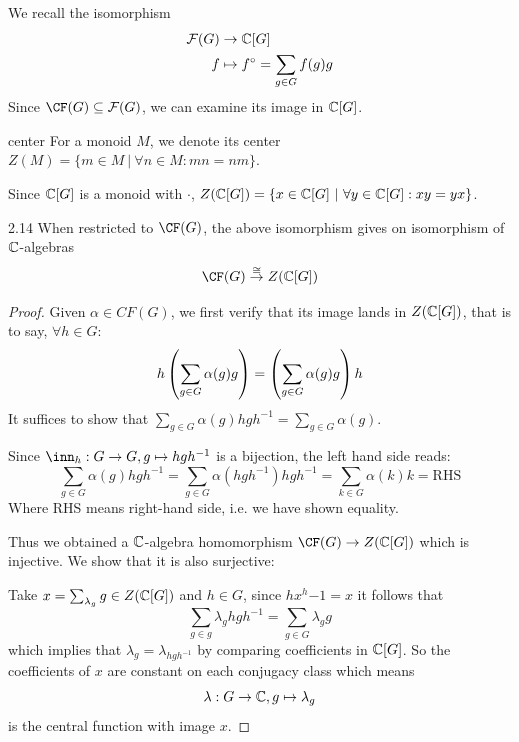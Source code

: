 \documentclass[twoside = false,	%
		headsepline,		%
		parskip = true,
		]{scrbook}						%
\begin{document}
    We recall the isomorphism
    \begin{equation*}
    \begin{split}
        \mathcal F(G) &\to \mathbb C[G] \\
            f &\mapsto f^\circ = \sum_{g \in G}f(g)g
    \end{split}
    \end{equation*}
    Since $\CF(G) \subseteq \cF(G)$, we can examine its image in $\mathbb C[G]$.
    \begin{definition*}{center}
        For a monoid $M$, we denote its center $Z(M) = \{m \in M \ | \ \forall n \in M: mn = nm\}$.
    \end{definition*}
    Since $\mathbb C[G]$ is a monoid with $\cdot$, $Z(\mathbb C[G]) = \{x \in \mathbb C[G] \ | \ \forall y \in \mathbb C[G]: xy = yx \}$.

    \begin{corollary}{}{2.14}
        When restricted to $\CF(G)$, the above isomorphism gives on isomorphism of $\mathbb C$-algebras
        \begin{equation*}
            \CF(G) \overset{\cong}{\to} Z(\C[G])
        \end{equation*}
    \end{corollary}
    \begin{proof}
        Given $\alpha \in CF(G)$, we first verify that its image lands in $Z(\mathbb C[G])$, that is to say, $\forall h \in G$:
        \begin{equation*}
            h \left( \sum_{g \in G} \alpha(g) g\right) = \left( \sum_{g \in G} \alpha(g)g\right)h
        \end{equation*}
        It suffices to show that $\sum_{g \in G} \alpha(g) h g h^{-1} = \sum_{g \in G} \alpha(g)$.
        
        Since $\inn_h: G \to G, g \mapsto hgh^{-1}$ is a bijection, the left hand side reads:
        \begin{equation*}
            \sum_{g \in G} \alpha(g) h g h^{-1} = \sum_{g \in G} \alpha(hgh^{-1}) h g h^{-1} = \sum_{k \in G} \alpha(k) k = \text{RHS}
        \end{equation*}
        Where RHS means right-hand side, i.e. we have shown equality.

        Thus we obtained a $\mathbb C$-algebra homomorphism $\CF(G) \to Z(\C[G])$ which is injective. We show that it is also surjective:

        Take $x = \sum_{\lambda_g} g \in Z(\mathbb C[G])$ and $h \in G$, since $hx^h{-1} = x$ it follows that
        \begin{equation*}
            \sum_{g \in g} \lambda_g h g h^ {-1} = \sum_{g \in G} \lambda_g g
        \end{equation*}
        which implies that $\lambda_g = \lambda_{hgh^{-1}}$ by comparing coefficients in $\mathbb C[G]$. So the coefficients of $x$ are constant on each conjugacy class which means
        \begin{equation*}
            \lambda: G \to \mathbb C, g \mapsto \lambda_g 
        \end{equation*}
        is the central function with image $x$.
    \end{proof}
\end{document}
